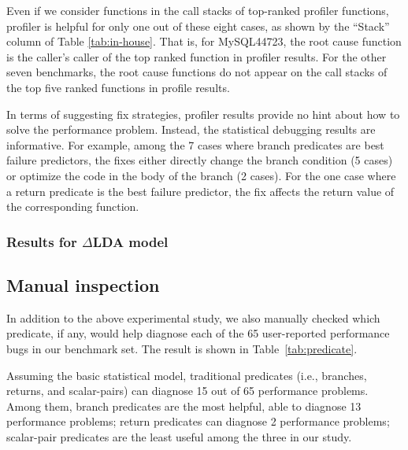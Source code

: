 Even if we consider functions in the call stacks of top-ranked
profiler functions, profiler is helpful for only one out of these eight cases,
as shown by the ``Stack'' column of Table \ref{tab:in-house}. That is, for
MySQL44723, the root cause function is the caller's caller of the top ranked
function in profiler results. For the other seven benchmarks, the root
cause functions do not appear on the call stacks of the top five ranked 
functions in profile results.




In terms of suggesting fix strategies, profiler results provide no hint
about how to solve the performance problem. Instead, the statistical debugging
results are informative.
For example, among the 7 cases where branch predicates are 
best failure predictors, the fixes either directly change the branch condition 
(5 cases) or optimize the code in the body of the branch (2 cases).
For the one case where a return predicate is the best failure predictor,
the fix affects the return value of the corresponding function.


\subsubsection{Results for $\Delta$LDA model}
\label{sec:deltalda_results}







\subsection{Manual inspection}
\label{sec:manual_results}

In addition to the above experimental study, we also manually checked
which predicate, if any, would help diagnose each of the 65 user-reported
performance bugs in our benchmark set. The result is shown in 
Table~\ref{tab:predicate}. 

Assuming the basic statistical model,  
traditional predicates (i.e., branches, returns, and scalar-pairs) 
can diagnose 15 out of 65 performance 
problems. Among them,
branch predicates are the most helpful, able to diagnose 13 performance 
problems; return predicates can diagnose 2 performance problems; 
scalar-pair
predicates are the least useful among the three in our study.




